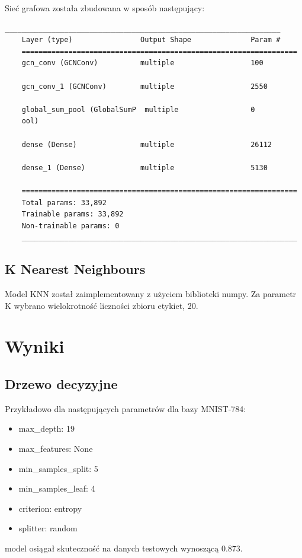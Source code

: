 \documentclass{article}
\begin{document}
Sieć grafowa została zbudowana w sposób następujący:
\begin{lstlisting}[style=siec]
    _________________________________________________________________
    Layer (type)                Output Shape              Param #   
    =================================================================
    gcn_conv (GCNConv)          multiple                  100       
                                                                    
    gcn_conv_1 (GCNConv)        multiple                  2550      
                                                                    
    global_sum_pool (GlobalSumP  multiple                 0         
    ool)                                                            
                                                                    
    dense (Dense)               multiple                  26112     
                                                                    
    dense_1 (Dense)             multiple                  5130      
                                                                    
    =================================================================
    Total params: 33,892
    Trainable params: 33,892
    Non-trainable params: 0
    _________________________________________________________________
\end{lstlisting}

\subsection{K Nearest Neighbours}
Model KNN został zaimplementowany z użyciem biblioteki numpy. Za parametr K 
wybrano wielokrotność liczności zbioru etykiet, 20.


\section{Wyniki}
\subsection{Drzewo decyzyjne}
Przykładowo dla następujących parametrów dla bazy MNIST-784:

\begin{itemize}
    \item max\_depth: 19
    \item max\_features: None
    \item min\_samples\_split: 5
    \item min\_samples\_leaf: 4
    \item criterion: entropy
    \item splitter: random
\end{itemize}
model osiągał skuteczność na danych testowych wynoszącą $0.873$.
\end{document}
